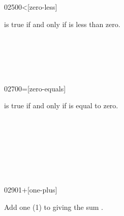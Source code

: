 \begin{worddef}[0less]{0250}{0<}[zero-less]
\item {}

	 is true if and only if  is less than zero.

	\begin{testing} %
		 \\
		 \\
		 \\
		 \\
	\end{testing}
\end{worddef}


\begin{worddef}{0270}{0=}[zero-equals]
\item {}

	 is true if and only if  is equal to zero.

	\begin{testing} %
		 \\
		 \\
		 \\
		 \\
		 \\
		 \\
	\end{testing}
\end{worddef}


\begin{worddef}{0290}{1+}[one-plus]
\item {}

	Add one (1) to  giving the sum
	.

	\begin{testing} %
		 \\
		 \\
		 \\
	\end{testing}
\end{worddef}


